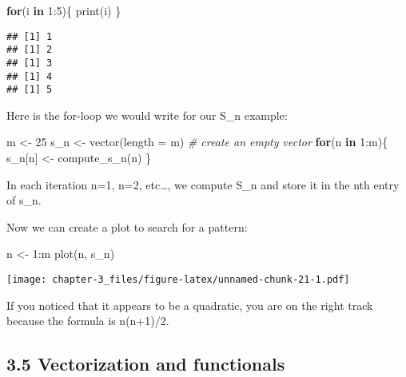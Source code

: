 \documentclass[
]{article}
\newenvironment{Shaded}{\begin{snugshade}}{\end{snugshade}}
\newcommand{\AttributeTok}[1]{\textcolor[rgb]{0.77,0.63,0.00}{#1}}
\newcommand{\CommentTok}[1]{\textcolor[rgb]{0.56,0.35,0.01}{\textit{#1}}}
\newcommand{\ControlFlowTok}[1]{\textcolor[rgb]{0.13,0.29,0.53}{\textbf{#1}}}
\newcommand{\DecValTok}[1]{\textcolor[rgb]{0.00,0.00,0.81}{#1}}
\newcommand{\FunctionTok}[1]{\textcolor[rgb]{0.00,0.00,0.00}{#1}}
\newcommand{\NormalTok}[1]{#1}
\newcommand{\OtherTok}[1]{\textcolor[rgb]{0.56,0.35,0.01}{#1}}
\newcommand{\SpecialCharTok}[1]{\textcolor[rgb]{0.00,0.00,0.00}{#1}}
\begin{document}
\begin{Shaded}
\begin{Highlighting}[]
\ControlFlowTok{for}\NormalTok{(i }\ControlFlowTok{in} \DecValTok{1}\SpecialCharTok{:}\DecValTok{5}\NormalTok{)\{}
  \FunctionTok{print}\NormalTok{(i)}
\NormalTok{\}}
\end{Highlighting}
\end{Shaded}

\begin{verbatim}
## [1] 1
## [1] 2
## [1] 3
## [1] 4
## [1] 5
\end{verbatim}

Here is the for-loop we would write for our S\_n example:

\begin{Shaded}
\begin{Highlighting}[]
\NormalTok{m }\OtherTok{\textless{}{-}} \DecValTok{25}
\NormalTok{s\_n }\OtherTok{\textless{}{-}} \FunctionTok{vector}\NormalTok{(}\AttributeTok{length =}\NormalTok{ m) }\CommentTok{\# create an empty vector}
\ControlFlowTok{for}\NormalTok{(n }\ControlFlowTok{in} \DecValTok{1}\SpecialCharTok{:}\NormalTok{m)\{}
\NormalTok{  s\_n[n] }\OtherTok{\textless{}{-}} \FunctionTok{compute\_s\_n}\NormalTok{(n)}
\NormalTok{\}}
\end{Highlighting}
\end{Shaded}

In each iteration n=1, n=2, etc\ldots, we compute S\_n and store it in
the nth entry of s\_n.

Now we can create a plot to search for a pattern:

\begin{Shaded}
\begin{Highlighting}[]
\NormalTok{n }\OtherTok{\textless{}{-}} \DecValTok{1}\SpecialCharTok{:}\NormalTok{m}
\FunctionTok{plot}\NormalTok{(n, s\_n)}
\end{Highlighting}
\end{Shaded}

\texttt{[image: chapter-3\_files/figure-latex/unnamed-chunk-21-1.pdf]}

If you noticed that it appears to be a quadratic, you are on the right
track because the formula is n(n+1)/2.

\hypertarget{vectorization-and-functionals}{%
\subsection{3.5 Vectorization and
functionals}\label{vectorization-and-functionals}}
\end{document}
